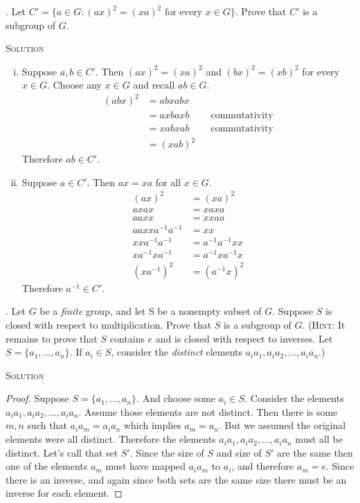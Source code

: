 \documentclass[twoside]{amsart}
\newcommand{\solution}{\textsc{Solution}\xspace}
\begin{document}
\begin{enumerate}[A.]
   . Let $C' = \{ a\in G : (ax)^2 = (xa)^2 
   \text{ for every } x \in G\}$.  Prove that $C'$ is a subgroup of $G$.

   \noindent \solution
   \begin{enumerate}[(i)]
      \item Suppose $a,b \in C'$. Then $(ax)^2=(xa)^2$ and $(bx)^2=(xb)^2$
      for every $x \in G$. Choose any $x \in G$ and recall $ab \in G$.
      \begin{align*}
         (abx)^2 & = abxabx \\
	         & = axbaxb && \text{commutativity} \\
		 & = xabxab && \text{commutativity} \\
		 & = (xab)^2
      \end{align*}
      Therefore $ab \in C'$.

      \item Suppose $a \in C'$. Then $ax=xa$ for all $x \in G$.
      \begin{align*}
         (ax)^2 & = (xa)^2 \\
	 axax   & = xaxa \\
	 aaxx   & = xxaa \\
	 aaxxa^{-1}a^{-1} & = xx\\
	 xxa^{-1}a^{-1} & = a^{-1}a^{-1}xx \\
	 xa^{-1}xa^{-1} & = a^{-1}xa^{-1}x \\
	 (xa^{-1})^2    & = (a^{-1}x)^2
      \end{align*}
      Therefore $a^{-1} \in C'$.
   \end{enumerate}

   . Let $G$ be a \emph{finite} group, and let S be a nonempty 
   subset of $G$. Suppose $S$ is closed with respect to 
   multiplication. Prove that $S$ is a subgroup of $G$. (\textsc{Hint:} It
   remains to prove that $S$ contains $e$ and is closed with respect
   to inverses. Let $S=\{a_1,\ldots,a_n\}$. If $a_i \in S$, consider
   the \emph{distinct} elements $a_ia_1,a_ia_2,\ldots,a_ia_n$.)

   \noindent \solution
   \begin{proof}
   Suppose $S=\{a_1,\ldots,a_n\}$. And choose some $a_i \in S$. Consider
   the elements $a_ia_1,a_ia_2,\ldots,a_ia_n$. Assume those elements
   are not distinct. Then there is some $m,n$ such that $a_ia_m=a_ia_n$ 
   which implies $a_m=a_n$. But we assumed the original elements were
   all distinct. Therefore the elements $a_ia_1,a_ia_2,\ldots,a_ia_n$
   must all be distinct. Let's call that set $S'$.
   Since the size of $S$ and size of $S'$ are the same then one of the
   elements $a_m$ must have mapped $a_ia_m$ to $a_i$, and therefore
   $a_m=e$. Since there is an inverse, and again since both sets are
   the same size there must be an inverse for each element.
   \end{proof}

\end{enumerate}
\end{document}
